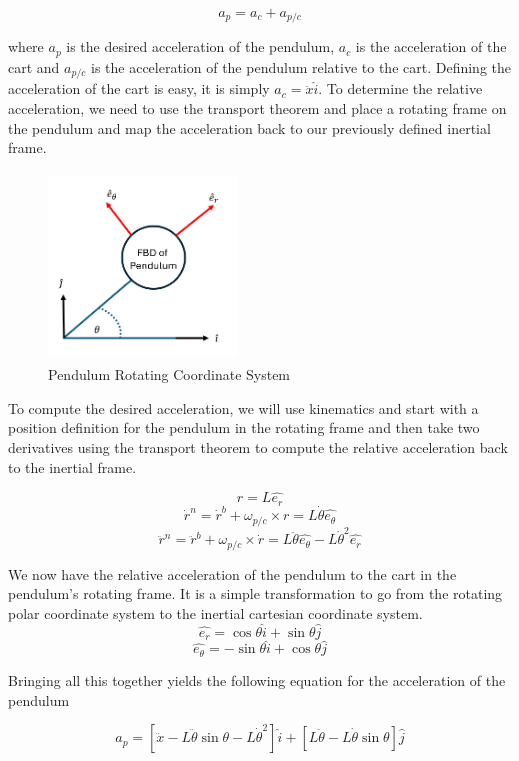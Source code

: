 \documentclass[titlepage]{article}
\begin{document}
\[a_p = a_c + a_{p/c}\]

where \(a_p\) is the desired acceleration of the pendulum, \(a_c\) is the acceleration of the cart and \(a_{p/c}\) is the acceleration of the pendulum relative to the cart. Defining the acceleration of the cart is easy, it is simply \(a_c=\ddot{x}\hat{i}\). To determine the relative acceleration, we need to use the transport theorem and place a rotating frame on the pendulum and map the acceleration back to our previously defined inertial frame.

\begin{figure}[H]
\center
\includegraphics[width=5cm, height=5cm]{rotating_frame.png}
\caption{Pendulum Rotating Coordinate System}
\end{figure}

To compute the desired acceleration, we will use kinematics and start with a position definition for the pendulum in the rotating frame and then take two derivatives using the transport theorem to compute the relative acceleration back to the inertial frame.

\[r = L\hat{e_{r}}\]
\[\dot{r}^{n} = \dot{r}^{b} + \omega_{p/c} \times r = L\dot{\theta}\hat{e_{\theta}}\]
\[\ddot{r}^{n} = \ddot{r}^{b} + \omega_{p/c} \times \dot{r} = L\ddot{\theta}\hat{e_{\theta}} - L\dot{\theta}^{2}\hat{e_{r}}\]

We now have the relative acceleration of the pendulum to the cart in the pendulum's rotating frame. It is a simple transformation to go from the rotating polar coordinate system to the inertial cartesian coordinate system.
\[\hat{e_{r}} = \cos{\theta} \hat{i} + \sin{\theta} \hat{j}\]
\[\hat{e_{\theta}} = -\sin{\theta} \hat{i} + \cos{\theta} \hat{j}\]

Bringing all this together yields the following equation for the acceleration of the pendulum

\begin{equation}
a_p = \left[\ddot{x} -L\ddot{\theta}\sin{\theta} - L\dot{\theta}^{2}\right]\hat{i} + \left[L\ddot{\theta} - L\dot{\theta}\sin{\theta}\right]\hat{j}
\end{equation}
\end{document}
